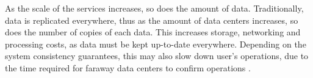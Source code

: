 As the scale of the services increases, so does the amount of data.
Traditionally, data is replicated everywhere, thus as the amount of data centers increases, so does the number of copies of each data.
This increases storage, networking and processing costs, as data must be kept up-to-date everywhere.
Depending on the system consistency guarantees, this may also slow down user's operations, 
due to the time required for faraway data centers to confirm operations \cite{caerus,mdcc,detock}.




